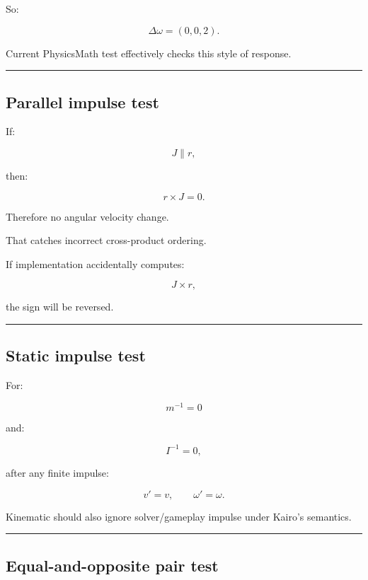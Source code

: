 So:

\[
\Delta\omega=(0,0,2).
\]

Current PhysicsMath test effectively checks this style of response.

\begin{center}\rule{0.5\linewidth}{0.5pt}\end{center}

\subsection{Parallel impulse test}\label{06-engine-ii-ch039-parallel-impulse-test}

If:

\[
J\parallel r,
\]

then:

\[
r\times J=0.
\]

Therefore no angular velocity change.

That catches incorrect cross-product ordering.

If implementation accidentally computes:

\[
J\times r,
\]

the sign will be reversed.

\begin{center}\rule{0.5\linewidth}{0.5pt}\end{center}

\subsection{Static impulse test}\label{06-engine-ii-ch039-static-impulse-test}

For:

\[
m^{-1}=0
\]

and:

\[
I^{-1}=0,
\]

after any finite impulse:

\[
v'=v,
\qquad
\omega'=\omega.
\]

Kinematic should also ignore solver/gameplay impulse under Kairo's semantics.

\begin{center}\rule{0.5\linewidth}{0.5pt}\end{center}

\subsection{Equal-and-opposite pair test}\label{06-engine-ii-ch039-equal-and-opposite-pair-test}

